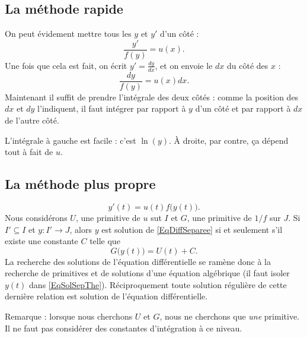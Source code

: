 \subsection{La méthode rapide}

On peut évidement mettre tous les $y$ et $y'$ d'un côté :
\begin{equation}
	\frac{ y' }{ f(y) }=u(x).
\end{equation}
Une fois que cela est fait, on écrit $y'=\frac{ dy }{ dx }$, et on envoie le $dx$ du côté des $x$ :
\begin{equation}
	\frac{ dy }{ f(y) }=u(x)dx.
\end{equation}
Maintenant il suffit de prendre l'intégrale des deux côtés : comme la position des $dx$ et $dy$ l'indiquent, il faut intégrer par rapport à $y$ d'un côté et par rapport à $dx$ de l'autre côté.

L'intégrale à gauche est facile : c'est $\ln(y)$. À droite, par contre, ça dépend tout à fait de $u$.

\subsection{La méthode plus propre}

\begin{equation}
	y'(t)=u(t)f\big( y(t) \big).
\end{equation}
Nous considérons $U$, une primitive de $u$ sut $I$ et $G$, une primitive de $1/f$ sur $J$.  Si $I'\subseteq I$ et $y\colon I'\to J$, alors $y$ est solution de \eqref{EqDiffSeparee} si et seulement s'il existe une constante $C$ telle que
\begin{equation}		\label{EqSolSepThe}
	G\big( y(t) \big)=U(t)+C.
\end{equation}
La recherche des solutions de l'équation différentielle se ramène donc à la recherche de primitives et de solutions d'une équation algébrique (il faut isoler $y(t)$ dans \eqref{EqSolSepThe}). Réciproquement toute solution régulière de cette dernière relation est solution de l'équation différentielle.

Remarque : lorsque nous cherchons $U$ et $G$, nous ne cherchons que \emph{une} primitive. Il ne faut pas considérer des constantes d'intégration à ce niveau.

